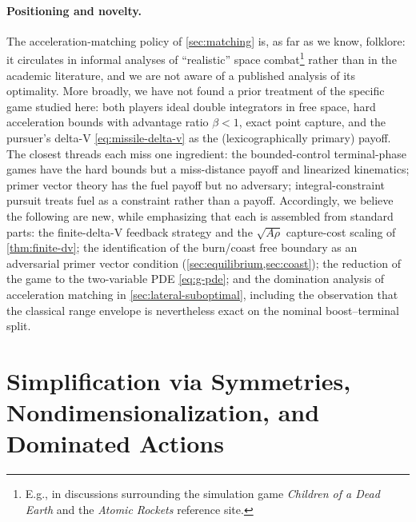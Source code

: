\documentclass{article}
\theoremstyle{remark}
\begin{document}
\paragraph{Positioning and novelty.}
The acceleration-matching policy of \cref{sec:matching} is, as far as we know,
folklore: it circulates in informal analyses of ``realistic'' space
combat\footnote{E.g., in discussions surrounding the simulation game
  \emph{Children of a Dead Earth} and the \emph{Atomic Rockets} reference site.}
rather than in the academic literature, and we are not aware of a published
analysis of its optimality.  More broadly, we have not found a prior treatment
of the specific game studied here: both players ideal double integrators in free
space, hard acceleration bounds with advantage ratio $\beta < 1$, exact point
capture, and the pursuer's delta-V \cref{eq:missile-delta-v} as the
(lexicographically primary) payoff.  The closest threads each miss one
ingredient: the bounded-control terminal-phase games have the hard bounds but a
miss-distance payoff and linearized kinematics; primer vector theory has the
fuel payoff but no adversary; integral-constraint pursuit treats fuel as a
constraint rather than a payoff.  Accordingly, we believe the following are new,
while emphasizing that each is assembled from standard parts: the finite-delta-V
feedback strategy and the $\sqrt{A\rho}$ capture-cost scaling of
\cref{thm:finite-dv}; the identification of the burn/coast free boundary as an
adversarial primer vector condition (\cref{sec:equilibrium,sec:coast}); the
reduction of the game to the two-variable PDE \cref{eq:g-pde}; and the
domination analysis of acceleration matching in \cref{sec:lateral-suboptimal},
including the observation that the classical range envelope is nevertheless
exact on the nominal boost--terminal split.

\section{Simplification via Symmetries, Nondimensionalization, and Dominated Actions}
\label{sec:symmetries}
\end{document}
